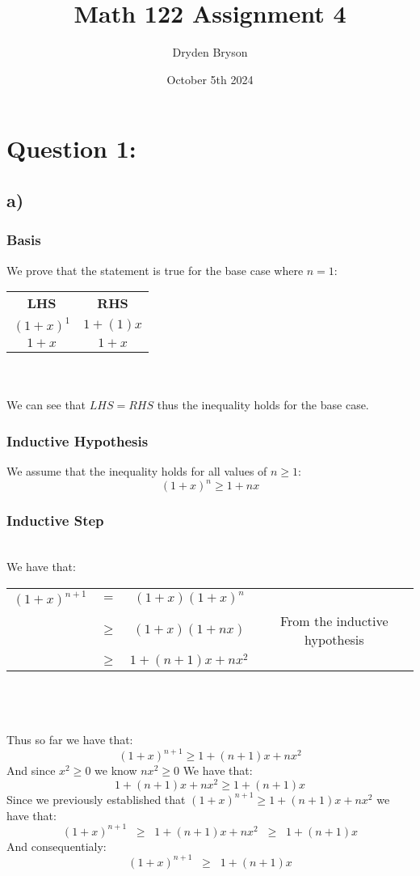 \documentclass{article}
\title{Math 122 Assignment 4}
\author{Dryden Bryson}
\date{October 5th 2024}
\begin{document}
\maketitle
\newpage
\section*{Question 1:}
\subsection*{a)}
\subsubsection*{\textbf{Basis}}
We prove that the statement is true for the base case where $n=1$:\\ 
\begin{table}[htp]
\centering
\begin{tabular}{cc}
  \textbf{LHS} & \textbf{RHS}  \\
  $(1+x)^1$ & $1+(1)x$\\
  $1+x$ & $1+x$
\end{tabular}
\end{table} \\ \\
We can see that $LHS=RHS$ thus the inequality holds for the base case.
\subsubsection*{Inductive Hypothesis}
We assume that the inequality holds for all values of $n\geq 1$:$$(1+x)^{n}\geq 1+nx$$
\subsubsection*{Inductive Step}
 \\We have that:

\begin{table}[htp]
  \centering
  \begin{tabular}{cccc}
    $(1+x)^{n+1}$ & $=$  & $(1+x)(1+x)^{n}$  &  \\
    & $\geq$ & $(1+x)(1+nx)$ & From the inductive hypothesis\\
    & $\geq$ & $1+(n+1)x+nx^{2}$ & \\
  \end{tabular}
  \end{table}
 \\\\\\
Thus so far we have that: $$(1+x)^{n+1} \geq 1+(n+1)x+nx^{2}$$
And since $x^{2} \geq 0$ we know $nx^{2}\geq 0$ We have that: $$1+(n+1)x+nx^{2}\geq 1+(n+1)x$$
Since we previously established that $(1+x)^{n+1}\geq 1+(n+1)x+nx^{2}$ we have that:
$$(1+x)^{n+1}\;\;\geq\;\; 1+(n+1)x+nx^{2}\;\;\geq\;\; 1+(n+1)x$$
And consequentialy:
$$(1+x)^{n+1}\;\;\geq\;\; 1+(n+1)x$$
\end{document}
